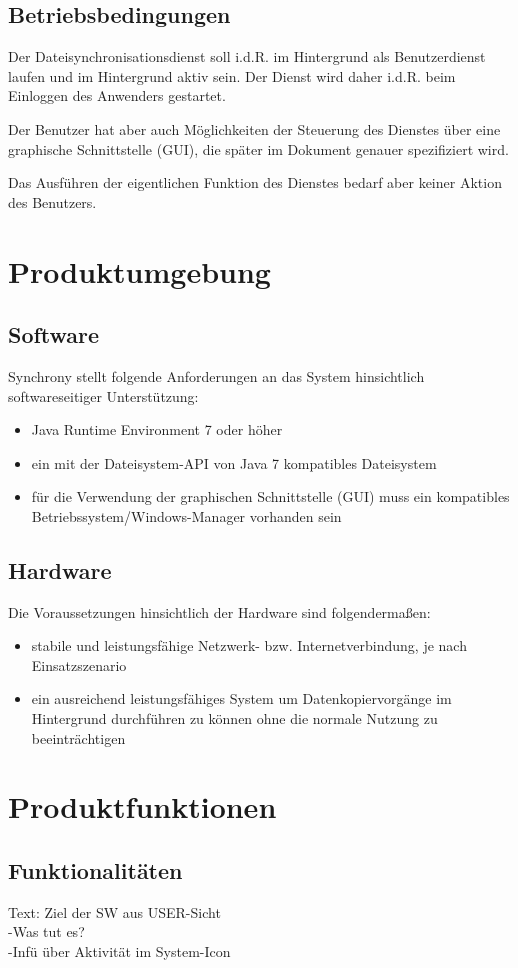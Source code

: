 \documentclass[12pt,oneside,a4paper,bibtotoc,liststotoc,pointlessnumbers]{scrartcl}
\begin{document}
\subsection{Betriebsbedingungen}
Der Dateisynchronisationsdienst soll i.d.R. im Hintergrund als Benutzerdienst laufen und im Hintergrund aktiv sein. Der Dienst wird daher i.d.R. beim Einloggen des Anwenders gestartet.\par
Der Benutzer hat aber auch Möglichkeiten der Steuerung des Dienstes über eine graphische Schnittstelle (GUI), die später im Dokument genauer spezifiziert wird.\par
Das Ausführen der eigentlichen Funktion des Dienstes bedarf aber keiner Aktion des Benutzers.

\newpage
\section{Produktumgebung}
\subsection{Software}
Synchrony stellt folgende Anforderungen an das System hinsichtlich softwareseitiger Unterstützung:
\begin{itemize}
	\item Java Runtime Environment 7 oder höher
	\item ein mit der Dateisystem-API von Java 7 kompatibles Dateisystem
	\item für die Verwendung der graphischen Schnittstelle (GUI) muss ein kompatibles Betriebssystem/Windows-Manager vorhanden sein
\end{itemize}
\subsection{Hardware}
Die Voraussetzungen hinsichtlich der Hardware sind folgendermaßen:
\begin{itemize}
	\item stabile und leistungsfähige Netzwerk- bzw. Internetverbindung, je nach Einsatzszenario
	\item ein ausreichend leistungsfähiges System um Datenkopiervorgänge im Hintergrund durchführen zu können ohne die normale Nutzung zu beeinträchtigen
\end{itemize}
\newpage
\section{Produktfunktionen}
\subsection{Funktionalitäten}
Text: Ziel der SW aus USER-Sicht\\
-Was tut es?\\
-Infü über Aktivität im System-Icon
\end{document}
